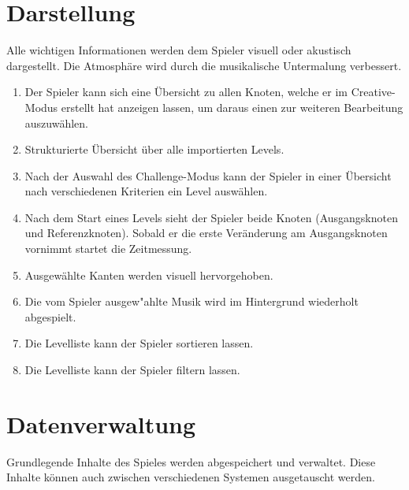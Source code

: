 \section{Darstellung}
Alle wichtigen Informationen werden dem Spieler visuell oder akustisch dargestellt. Die Atmosphäre wird durch die musikalische Untermalung verbessert.

\begin{enumerate}[resume]

\item Der Spieler kann sich eine Übersicht zu allen Knoten, welche er im Creative-Modus erstellt hat anzeigen lassen, um daraus einen zur weiteren Bearbeitung auszuwählen.
\item Strukturierte Übersicht über alle importierten Levels. %
\item Nach der Auswahl des Challenge-Modus kann der Spieler in einer Übersicht nach verschiedenen Kriterien ein Level auswählen.
\item Nach dem Start eines Levels sieht der Spieler beide Knoten (Ausgangsknoten und Referenzknoten). Sobald er die erste Veränderung am Ausgangsknoten vornimmt startet die Zeitmessung.
\item Ausgewählte Kanten werden visuell hervorgehoben.
\item Die vom Spieler ausgew{"a}hlte Musik wird im Hintergrund wiederholt abgespielt. %
\item Die Levelliste kann der Spieler sortieren lassen. %
\item Die Levelliste kann der Spieler filtern lassen. %

\end{enumerate}
\section{Datenverwaltung}
Grundlegende Inhalte des Spieles werden abgespeichert und verwaltet.
Diese Inhalte können auch zwischen verschiedenen Systemen ausgetauscht werden. 

